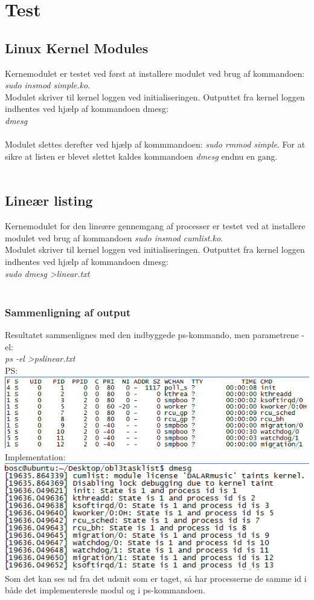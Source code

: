 \chapter{Test}
\section{Linux Kernel Modules}
Kernemodulet er testet ved først at installere modulet ved brug af kommandoen: \textit{sudo insmod simple.ko}.
\\
Modulet skriver til kernel loggen ved initialiseringen. Outputtet fra kernel loggen indhentes ved hjælp af kommandoen dmesg:\\
\textit{dmesg}
\\
\\
Modulet slettes derefter ved hjælp af kommmandoen: \textit{sudo rmmod simple}. For at sikre at listen er blevet slettet kaldes kommandoen \textit{dmesg} endnu en gang.
\\
\\
\section{Lineær listing}
Kernemodulet for den lineære gennemgang af processer er testet ved at installere modulet ved brug af kommandoen \textit{sudo insmod cumlist.ko}.
\\
Modulet skriver til kernel loggen ved initialiseringen. Outputtet fra kernel loggen indhentes ved hjælp af kommandoen dmesg:\\
\textit{sudo dmesg \textgreater linear.txt}
\\
\\
\subsection{Sammenligning af output}
Resultatet sammenlignes med den indbyggede ps-kommando, men parametrene -el:\\
\textit{ps -el \textgreater pslinear.txt}
\\
PS:
\includegraphics[width=\textwidth]{Testing/PSLinear.png}
\\
Implementation:
\includegraphics[width=\textwidth]{Testing/Linear.png}
\\
Som det kan ses ud fra det udsnit som er taget, så har processerne de samme id i både det implementerede modul og i ps-kommandoen.

